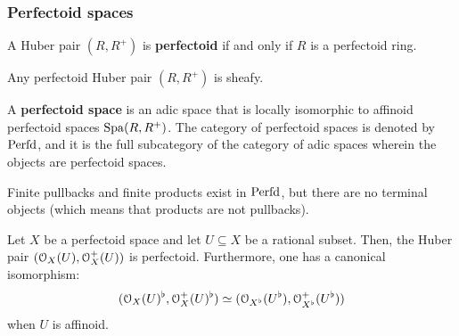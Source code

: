             \subsubsection{Perfectoid spaces}
                \begin{definition} \label{def: perfectoid_huber_pairs}
                    A Huber pair $(R, R^+)$ is \textbf{perfectoid} if and only if $R$ is a perfectoid ring. 
                \end{definition}
                
                \begin{lemma} \label{lemma: perfectoid_huber_pairs_are_sheafy}
                    Any perfectoid Huber pair $(R, R^+)$ is sheafy.
                \end{lemma}
                \begin{definition} \label{def: perfectoid_spaces}
                    A \textbf{perfectoid space} is an adic space that is locally isomorphic to affinoid perfectoid spaces $\mathrm{Spa}(R, R^+)$. The category of perfectoid spaces is denoted by $\mathrm{Perfd}$, and it is the full subcategory of the category of adic spaces wherein the objects are perfectoid spaces.
                \end{definition}
                \begin{proposition} \label{prop: pullbacks_products_of_perfectoid_spaces}
                    Finite pullbacks and finite products exist in $\mathrm{Perfd}$, but there are no terminal objects (which means that products are not pullbacks). 
                \end{proposition}
                
                \begin{proposition} \label{prop: tilting_glues}
                    Let $X$ be a perfectoid space and let $U \subseteq X$ be a rational subset. Then, the Huber pair $(\mathcal{O}_X(U), \mathcal{O}_X^+(U))$ is perfectoid. Furthermore, one has a canonical isomorphism:
                        $$(\mathcal{O}_X(U)^{\flat}, \mathcal{O}_X^+(U)^{\flat}) \simeq (\mathcal{O}_{X^{\flat}}(U^{\flat}), \mathcal{O}_{X^{\flat}}^+(U^{\flat}))$$
                    when $U$ is affinoid.
                \end{proposition}
                \begin{theorem} \label{theorem: the_tilting_equivalence}
                    
                \end{theorem}
